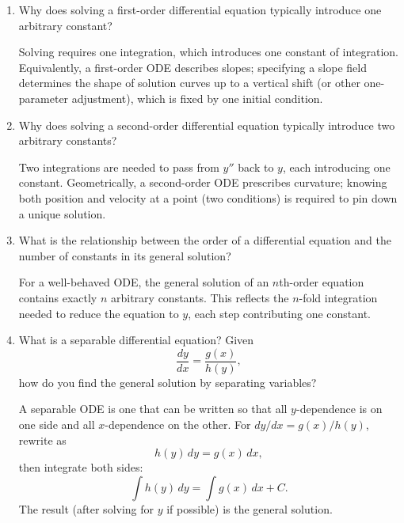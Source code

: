 \documentclass{self-check}
\begin{document}
\begin{enumerate}[leftmargin=*, itemsep=8pt]
  \item Why does solving a first-order differential equation
    typically introduce one arbitrary constant?

    \begin{answer} Solving requires one integration, which
      introduces one constant of integration.  Equivalently, a
      first-order ODE describes slopes; specifying a slope field
      determines the shape of solution curves up to a vertical shift
      (or other one-parameter adjustment), which is fixed by one
      initial condition.
    \end{answer}

  \item Why does solving a second-order differential equation
    typically introduce two arbitrary constants?

    \begin{answer} Two integrations are needed to pass from $y''$
      back to $y$, each introducing one constant.  Geometrically, a
      second-order ODE prescribes curvature; knowing both position and
      velocity at a point (two conditions) is required to pin down a
      unique solution.
    \end{answer}

  \item What is the relationship between the order of a differential
    equation and the number of constants in its general solution?

    \begin{answer} For a well-behaved ODE, the general solution of
      an $n$th-order equation contains exactly $n$ arbitrary constants.
      This reflects the $n$-fold integration needed to reduce the
      equation to $y$, each step contributing one constant.
    \end{answer}

  \item What is a separable differential equation? Given \[
    \frac{dy}{dx}=\frac{g(x)}{h(y)}, \] how do you find the general
    solution by separating variables?

    \begin{answer} A separable ODE is one that can be written so
      that all $y$-dependence is on one side and all $x$-dependence on
      the other.  For $dy/dx=g(x)/h(y)$, rewrite as
      \[
        h(y)\,dy = g(x)\,dx,
      \]
      then integrate both sides:
      \[
        \int h(y)\,dy = \int g(x)\,dx + C.
      \]
      The result (after solving for $y$ if possible) is the general solution.
    \end{answer}


\end{enumerate}
\end{document}
